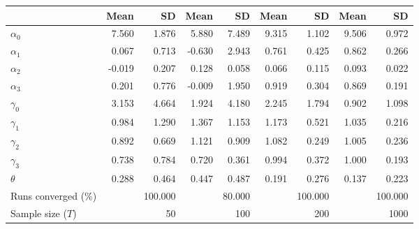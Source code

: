 
\begin{tabular}[t]{lrrrrrrrr}
\toprule
  & Mean & SD & Mean  & SD  & Mean   & SD   & Mean    & SD   \\
\midrule
$\alpha_{0}$ & 7.560 & 1.876 & 5.880 & 7.489 & 9.315 & 1.102 & 9.506 & 0.972\\
$\alpha_{1}$ & 0.067 & 0.713 & -0.630 & 2.943 & 0.761 & 0.425 & 0.862 & 0.266\\
$\alpha_{2}$ & -0.019 & 0.207 & 0.128 & 0.058 & 0.066 & 0.115 & 0.093 & 0.022\\
$\alpha_{3}$ & 0.201 & 0.776 & -0.009 & 1.950 & 0.919 & 0.304 & 0.869 & 0.191\\
$\gamma_{0}$ & 3.153 & 4.664 & 1.924 & 4.180 & 2.245 & 1.794 & 0.902 & 1.098\\
$\gamma_{1}$ & 0.984 & 1.290 & 1.367 & 1.153 & 1.173 & 0.521 & 1.035 & 0.216\\
$\gamma_{2}$ & 0.892 & 0.669 & 1.121 & 0.909 & 1.082 & 0.249 & 1.005 & 0.236\\
$\gamma_{3}$ & 0.738 & 0.784 & 0.720 & 0.361 & 0.994 & 0.372 & 1.000 & 0.193\\
$\theta$ & 0.288 & 0.464 & 0.447 & 0.487 & 0.191 & 0.276 & 0.137 & 0.223\\
Runs converged (\%) &  & 100.000 &  & 80.000 &  & 100.000 &  & 100.000\\
Sample size ($T$) &  & 50 &  & 100 &  & 200 &  & 1000\\
\bottomrule
\end{tabular}
